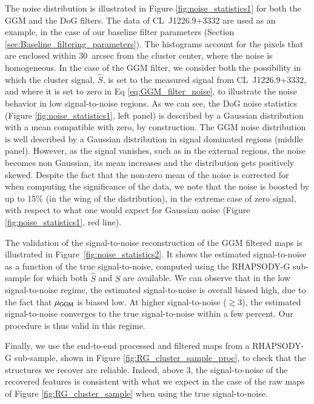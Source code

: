 \documentclass[twocolumn,traditabstract]{aa}
\begin{document}
The noise distribution is illustrated in Figure \ref{fig:noise_statistics1} for both the GGM and the DoG filters. The data of \mbox{CL~J1226.9+3332} are used as an example, in the case of our baseline filter parameters (Section \ref{sec:Baseline_filtering_parameters}). The histograms account for the pixels that are enclosed within 30~arcsec from the cluster center, where the noise is homogeneous. In the case of the GGM filter, we consider both the possibility in which the cluster signal, $\hat{S}$, is set to the measured signal from \mbox{CL~J1226.9+3332}, and where it is set to zero in Eq \ref{eq:GGM_filter_noise}, to illustrate the noise behavior in low signal-to-noise regions. As we can see, the DoG noise statistics (Figure \ref{fig:noise_statistics1}, left panel) is described by a Gaussian distribution with a mean compatible with zero, by construction. The GGM noise distribution is well described by a Gaussian distribution in signal dominated regions (middle panel). However, as the signal vanishes, such as in the external regions, the noise becomes non Gaussian, its mean increases and the distribution gets positively skewed. Despite the fact that the non-zero mean of the noise is corrected for when computing the significance of the data, we note that the noise is boosted by up to 15\% (in the wing of the distribution), in the extreme case of zero signal, with respect to what one would expect for Gaussian noise (Figure \ref{fig:noise_statistics1}, red line).

The validation of the signal-to-noise reconstruction of the GGM filtered maps is illustrated in Figure~\ref{fig:noise_statistics2}. It shows the estimated signal-to-noise as a function of the true signal-to-noise, computed using the RHAPSODY-G sub-sample for which both $\hat{S}$ and $S$ are available. We can observe that in the low signal-to-noise regime, the estimated signal-to-noise is overall biased high, due to the fact that $\mu_{\rm GGM}$ is biased low. At higher signal-to-noise ($\gtrsim 3$), the estimated signal-to-noise converges to the true signal-to-noise within a few percent. Our procedure is thus valid in this regime.

Finally, we use the end-to-end processed and filtered maps from a RHAPSODY-G sub-sample, shown in Figure \ref{fig:RG_cluster_sample_proc}, to check that the structures we recover are reliable. Indeed, above 3, the signal-to-noise of the recovered features is consistent with what we expect in the case of the raw maps of Figure \ref{fig:RG_cluster_sample} when using the true signal-to-noise.
\end{document}
